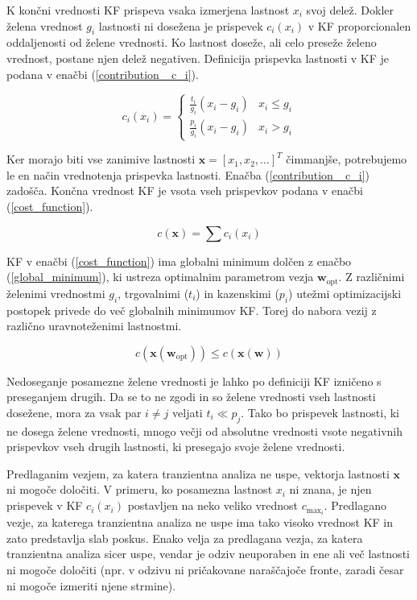 \documentclass[journal,a4paper,twoside]{sty/IEEEtran}
\begin{document}
K končni vrednosti KF prispeva vsaka izmerjena lastnost $x_i$ svoj delež. Dokler želena vrednost $g_i$ lastnosti ni dosežena je prispevek $c_i(x_i)$ v KF proporcionalen oddaljenosti od želene vrednosti. Ko lastnost doseže, ali celo preseže želeno vrednost, postane njen delež negativen. Definicija prispevka lastnosti v KF je podana v enačbi (\ref{contribution _c_i}).

\begin{equation}
	\label{contribution _c_i}
	c_i(x_i) =
	\left\{
		\begin{array}{ll}
			\frac{t_i}{g_i} (x_i - g_i) & x_i \le g_i \\
			\frac{p_i}{g_i} (x_i - g_i) & x_i > g_i
		\end{array}
	\right.
\end{equation}

Ker morajo biti vse zanimive lastnosti $\mathbf{x} = [x_1, x_2, \ldots]^T$ čimmanjše, potrebujemo le en način vrednotenja prispevka lastnosti. Enačba (\ref{contribution _c_i}) zadošča. Končna vrednost KF je vsota vseh prispevkov podana v enačbi (\ref{cost_function}).

\begin{equation}
	\label{cost_function}
	c(\mathbf{x}) = \sum c_i(x_i)
\end{equation}

KF v enačbi (\ref{cost_function}) ima globalni minimum dolčen z enačbo (\ref{global_minimum}), ki ustreza optimalnim parametrom vezja $\mathbf{w}_\mathrm{opt}$. Z različnimi želenimi vrednostmi $g_i$, trgovalnimi ($t_i$) in kazenskimi ($p_i$) utežmi optimizacijski postopek privede do več globalnih minimumov KF. Torej do nabora vezij z različno uravnoteženimi lastnostmi.

\begin{equation}
	\label{global_minimum}
	c(\mathbf{x}(\mathbf{w}_\mathrm{opt})) \le c(\mathbf{x}(\mathbf{w}))
\end{equation}

Nedoseganje posamezne želene vrednosti je lahko po definiciji KF izničeno s preseganjem drugih. Da se to ne zgodi in so želene vrednosti vseh lastnosti dosežene, mora za vsak par $i \ne j$ veljati $t_i \ll p_j$. Tako bo prispevek lastnosti, ki ne dosega želene vrednosti, mnogo večji od absolutne vrednosti vsote negativnih prispevkov vseh drugih lastnosti, ki presegajo svoje želene vrednosti.

Predlaganim vezjem, za katera tranzientna analiza ne uspe, vektorja lastnosti $\mathbf{x}$ ni mogoče določiti. V primeru, ko posamezna lastnost $x_i$ ni znana, je njen prispevek v KF $c_i(x_i)$ postavljen na neko veliko vrednost $c_{\mathrm{max}_i}$. Predlagano vezje, za katerega tranzientna analiza ne uspe ima tako visoko vrednost KF in zato predstavlja slab poskus. Enako velja za predlagana vezja, za katera tranzientna analiza sicer uspe, vendar je odziv neuporaben in ene ali več lastnosti ni mogoče določiti (npr. v odzivu ni pričakovane naraščajoče fronte, zaradi česar ni mogoče izmeriti njene strmine). 
\end{document}
